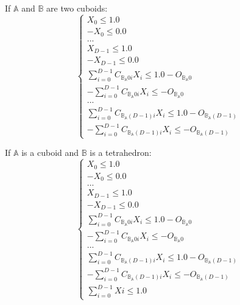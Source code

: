 \documentclass[12pt, a4paper]{article}
\begin{document}
If $\mathbb{A}$ and $\mathbb{B}$ are two cuboids:
\begin{equation}
\left\lbrace
\begin{array}{c}
X_0\le1.0\\
-X_0\le0.0\\
...\\
X_{D-1}\le1.0\\
-X_{D-1}\le0.0\\
\sum_{i=0}^{D-1}C_{\mathbb{B}_\mathbb{A}0i}X_i\le1.0-O_{\mathbb{B}_\mathbb{A}0}\\
-\sum_{i=0}^{D-1}C_{\mathbb{B}_\mathbb{A}0i}X_i\le-O_{\mathbb{B}_\mathbb{A}0}\\
...\\
\sum_{i=0}^{D-1}C_{\mathbb{B}_\mathbb{A}(D-1)i}X_i\le1.0-O_{\mathbb{B}_\mathbb{A}(D-1)}\\
-\sum_{i=0}^{D-1}C_{\mathbb{B}_\mathbb{A}(D-1)i}X_i\le-O_{\mathbb{B}_\mathbb{A}(D-1)}
\end{array}
\right.
\end{equation}

If $\mathbb{A}$ is a cuboid and $\mathbb{B}$ is a tetrahedron:
\begin{equation}
\left\lbrace
\begin{array}{c}
X_0\le1.0\\
-X_0\le0.0\\
...\\
X_{D-1}\le1.0\\
-X_{D-1}\le0.0\\
\sum_{i=0}^{D-1}C_{\mathbb{B}_\mathbb{A}0i}X_i\le1.0-O_{\mathbb{B}_\mathbb{A}0}\\
-\sum_{i=0}^{D-1}C_{\mathbb{B}_\mathbb{A}0i}X_i\le-O_{\mathbb{B}_\mathbb{A}0}\\
...\\
\sum_{i=0}^{D-1}C_{\mathbb{B}_\mathbb{A}(D-1)i}X_i\le1.0-O_{\mathbb{B}_\mathbb{A}(D-1)}\\
-\sum_{i=0}^{D-1}C_{\mathbb{B}_\mathbb{A}(D-1)i}X_i\le-O_{\mathbb{B}_\mathbb{A}(D-1)}\\
\sum_{i=0}^{D-1}Xi\le1.0
\end{array}
\right.
\end{equation}
\end{document}
